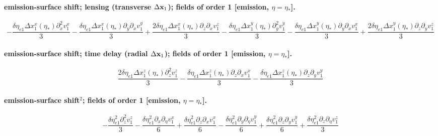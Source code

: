 \paragraph{emission-surface shift; lensing (transverse $\Delta\mathbf x_1$); fields of order 1 [emission, $\eta=\eta_*$].}
\begin{dmath*}- \frac{\delta\eta_{e1} {\Delta x^{x}_{1}}(\eta_*) \partial_{x}^{2}  {v^{x}_{1}}}{3} - \frac{\delta\eta_{e1} {\Delta x^{x}_{1}}(\eta_*) \partial_{y}\partial_{x}  {v^{y}_{1}}}{3} + \frac{2 \delta\eta_{e1} {\Delta x^{x}_{1}}(\eta_*) \partial_{z}\partial_{x}  {v^{z}_{1}}}{3} - \frac{\delta\eta_{e1} {\Delta x^{y}_{1}}(\eta_*) \partial_{y}^{2}  {v^{y}_{1}}}{3} - \frac{\delta\eta_{e1} {\Delta x^{y}_{1}}(\eta_*) \partial_{y}\partial_{x}  {v^{x}_{1}}}{3} + \frac{2 \delta\eta_{e1} {\Delta x^{y}_{1}}(\eta_*) \partial_{z}\partial_{y}  {v^{z}_{1}}}{3}\end{dmath*}
\paragraph{emission-surface shift; time delay (radial $\Delta\mathbf x_1$); fields of order 1 [emission, $\eta=\eta_*$].}
\begin{dmath*}\frac{2 \delta\eta_{e1} {\Delta x^{z}_{1}}(\eta_*) \partial_{z}^{2}  {v^{z}_{1}}}{3} - \frac{\delta\eta_{e1} {\Delta x^{z}_{1}}(\eta_*) \partial_{z}\partial_{x}  {v^{x}_{1}}}{3} - \frac{\delta\eta_{e1} {\Delta x^{z}_{1}}(\eta_*) \partial_{z}\partial_{y}  {v^{y}_{1}}}{3}\end{dmath*}
\paragraph{emission-surface shift${}^2$; fields of order 1 [emission, $\eta=\eta_*$].}
\begin{dmath*}- \frac{\delta\eta_{e1}^{2} \partial_{z}^{2}  {v^{z}_{1}}}{3} - \frac{\delta\eta_{e1}^{2} \partial_{x}\partial_{\eta}  {v^{x}_{1}}}{6} + \frac{\delta\eta_{e1}^{2} \partial_{z}\partial_{x}  {v^{x}_{1}}}{6} - \frac{\delta\eta_{e1}^{2} \partial_{y}\partial_{\eta}  {v^{y}_{1}}}{6} + \frac{\delta\eta_{e1}^{2} \partial_{z}\partial_{y}  {v^{y}_{1}}}{6} + \frac{\delta\eta_{e1}^{2} \partial_{z}\partial_{\eta}  {v^{z}_{1}}}{3}\end{dmath*}
